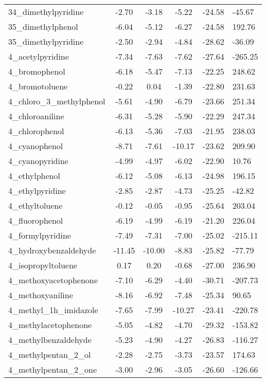 \documentclass{amsart}
\begin{document}
\begin{longtable}{L|C|C|C|X|X}
34\_dimethylpyridine & -2.70 & -3.18 & -5.22 & -24.58 & -45.67 \\ 
35\_dimethylphenol & -6.04 & -5.12 & -6.27 & -24.58 & 192.76 \\ 
35\_dimethylpyridine & -2.50 & -2.94 & -4.84 & -28.62 & -36.09 \\ 
4\_acetylpyridine & -7.34 & -7.63 & -7.62 & -27.64 & -265.25 \\ 
4\_bromophenol & -6.18 & -5.47 & -7.13 & -22.25 & 248.62 \\ 
4\_bromotoluene & -0.22 & 0.04 & -1.39 & -22.80 & 231.63 \\ 
4\_chloro\_3\_methylphenol & -5.61 & -4.90 & -6.79 & -23.66 & 251.34 \\ 
4\_chloroaniline & -6.31 & -5.28 & -5.90 & -22.29 & 247.34 \\ 
4\_chlorophenol & -6.13 & -5.36 & -7.03 & -21.95 & 238.03 \\ 
4\_cyanophenol & -8.71 & -7.61 & -10.17 & -23.62 & 209.90 \\ 
4\_cyanopyridine & -4.99 & -4.97 & -6.02 & -22.90 & 10.76 \\ 
4\_ethylphenol & -6.12 & -5.08 & -6.13 & -24.98 & 196.15 \\ 
4\_ethylpyridine & -2.85 & -2.87 & -4.73 & -25.25 & -42.82 \\ 
4\_ethyltoluene & -0.12 & -0.05 & -0.95 & -25.64 & 203.04 \\ 
4\_fluorophenol & -6.19 & -4.99 & -6.19 & -21.20 & 226.04 \\ 
4\_formylpyridine & -7.49 & -7.31 & -7.00 & -25.02 & -215.11 \\ 
4\_hydroxybenzaldehyde & -11.45 & -10.00 & -8.83 & -25.82 & -77.79 \\ 
4\_isopropyltoluene & 0.17 & 0.20 & -0.68 & -27.00 & 236.90 \\ 
4\_methoxyacetophenone & -7.10 & -6.29 & -4.40 & -30.71 & -207.73 \\ 
4\_methoxyaniline & -8.16 & -6.92 & -7.48 & -25.34 & 90.65 \\ 
4\_methyl\_1h\_imidazole & -7.65 & -7.99 & -10.27 & -23.41 & -220.78 \\ 
4\_methylacetophenone & -5.05 & -4.82 & -4.70 & -29.32 & -153.82 \\ 
4\_methylbenzaldehyde & -5.23 & -4.90 & -4.27 & -26.83 & -116.27 \\ 
4\_methylpentan\_2\_ol & -2.28 & -2.75 & -3.73 & -23.57 & 174.63 \\ 
4\_methylpentan\_2\_one & -3.00 & -2.96 & -3.05 & -26.60 & -126.66 \\ 

\end{longtable}
\end{document}
